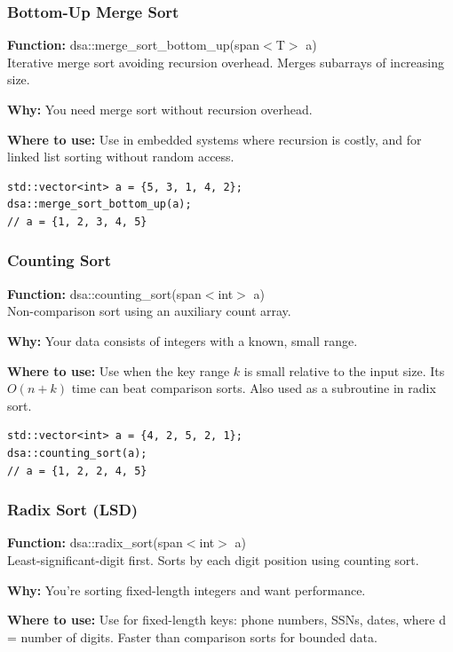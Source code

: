 \documentclass[11pt]{article}
\begin{document}
\subsubsection{Bottom-Up Merge Sort}
\textbf{Function:} dsa::merge\_sort\_bottom\_up(span$<$T$>$ a)\\

Iterative merge sort avoiding recursion overhead. Merges subarrays of increasing size.

\textbf{Why:} You need merge sort without recursion overhead. \par \textbf{Where to use:} Use in embedded systems where recursion is costly, and for linked list sorting without random access.

\begin{lstlisting}
std::vector<int> a = {5, 3, 1, 4, 2};
dsa::merge_sort_bottom_up(a);
// a = {1, 2, 3, 4, 5}
\end{lstlisting}

\subsubsection{Counting Sort}
\textbf{Function:} dsa::counting\_sort(span$<$int$>$ a)\\

Non-comparison sort using an auxiliary count array.

\textbf{Why:} Your data consists of integers with a known, small range. \par \textbf{Where to use:} Use when the key range \(k\) is small relative to the input size. Its \(O(n+k)\) time can beat comparison sorts. Also used as a subroutine in radix sort.

\begin{lstlisting}
std::vector<int> a = {4, 2, 5, 2, 1};
dsa::counting_sort(a);
// a = {1, 2, 2, 4, 5}
\end{lstlisting}

\subsubsection{Radix Sort (LSD)}
\textbf{Function:} dsa::radix\_sort(span$<$int$>$ a)\\

Least-significant-digit first. Sorts by each digit position using counting sort.

\textbf{Why:} You're sorting fixed-length integers and want performance. \par \textbf{Where to use:} Use for fixed-length keys: phone numbers, SSNs, dates, where d = number of digits. Faster than comparison sorts for bounded data.
\end{document}
